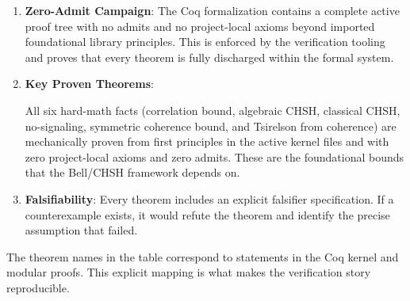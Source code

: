 \begin{enumerate}
    \item \textbf{Zero-Admit Campaign}: The Coq formalization contains a complete active proof tree with no admits and no project-local axioms beyond imported foundational library principles. This is enforced by the verification tooling and proves that every theorem is fully discharged within the formal system.
    
    \item \textbf{Key Proven Theorems}:
    \begin{center}
    \end{center}
    All six hard-math facts (correlation bound, algebraic CHSH, classical CHSH, no-signaling, symmetric coherence bound, and Tsirelson from coherence) are mechanically proven from first principles in the active kernel files  and  with zero project-local axioms and zero admits. These are the foundational bounds that the Bell/CHSH framework depends on.
    
    \item \textbf{Falsifiability}: Every theorem includes an explicit falsifier specification. If a counterexample exists, it would refute the theorem and identify the precise assumption that failed.
\end{enumerate}
The theorem names in the table correspond to statements in the Coq kernel and modular proofs. This explicit mapping is what makes the verification story reproducible.


